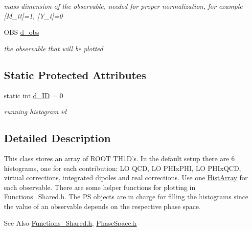 \begin{DoxyCompactItemize}
\begin{DoxyCompactList}\small\item\em mass dimension of the observable, needed for proper normalization, for example \mbox{[}M\-\_\-tt\mbox{]}=1, \mbox{[}Y\-\_\-t\mbox{]}=0 \end{DoxyCompactList}\item 
\hypertarget{classHistArray_a7d8b20c78afd46e59467379cf4fe472b}{O\-B\-S \hyperlink{classHistArray_a7d8b20c78afd46e59467379cf4fe472b}{d\-\_\-obs}}\label{classHistArray_a7d8b20c78afd46e59467379cf4fe472b}

\begin{DoxyCompactList}\small\item\em the observable that will be plotted \end{DoxyCompactList}\end{DoxyCompactItemize}
\subsection*{Static Protected Attributes}
\begin{DoxyCompactItemize}
\item 
\hypertarget{classHistArray_a01616b3115c8b243e2bd924788d47589}{static int \hyperlink{classHistArray_a01616b3115c8b243e2bd924788d47589}{d\-\_\-\-I\-D} = 0}\label{classHistArray_a01616b3115c8b243e2bd924788d47589}

\begin{DoxyCompactList}\small\item\em running histogram id \end{DoxyCompactList}\end{DoxyCompactItemize}


\subsection{Detailed Description}
This class stores an array of R\-O\-O\-T T\-H1\-D's. In the default setup there are 6 histograms, one for each contribution\-: L\-O Q\-C\-D, L\-O P\-H\-Ix\-P\-H\-I, L\-O P\-H\-Ix\-Q\-C\-D, virtual corrections, integrated dipoles and real corrections. Use one \hyperlink{classHistArray}{Hist\-Array} for each observable. There are some helper functions for plotting in \hyperlink{Functions__Shared_8h_source}{Functions\-\_\-\-Shared.\-h}. The P\-S objects are in charge for filling the histograms since the value of an observable depends on the respective phase space. \begin{DoxySeeAlso}{See Also}
\hyperlink{Functions__Shared_8h_source}{Functions\-\_\-\-Shared.\-h}, \hyperlink{PhaseSpace_8h}{Phase\-Space.\-h} 
\end{DoxySeeAlso}


